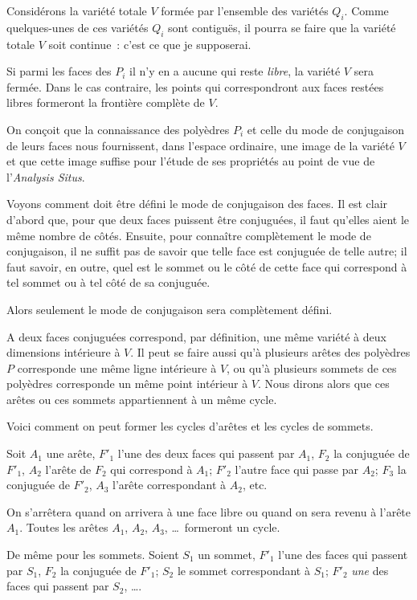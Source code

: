 \documentclass{article}
\begin{document}
Considérons la variété totale $V$ formée par l'ensemble des variétés $Q_{i}$. Comme quelques-unes de ces variétés $Q_{i}$ sont contiguës, il pourra se faire que la variété totale $V$ soit continue~: c'est ce que je supposerai.

Si parmi les faces des $P_{i}$ il n'y en a aucune qui reste \emph{libre}, la variété $V$ sera fermée. Dans le cas contraire, les points qui correspondront aux faces restées libres formeront la frontière complète de $V$.

On conçoit que la connaissance des polyèdres $P_{i}$ et celle du mode de conjugaison de leurs faces nous fournissent, dans l'espace ordinaire, une image de la variété $V$ et que cette image suffise pour l'étude de ses propriétés au point de vue de l'\emph{Analysis Situs}.

Voyons comment doit être défini le mode de conjugaison des faces. Il est clair d'abord que, pour que deux faces puissent être conjuguées, il faut qu'elles aient le même nombre de côtés. Ensuite, pour connaître complètement le mode de conjugaison, il ne suffit pas de savoir que telle face est conjuguée de telle autre; il faut savoir, en outre, quel est le sommet ou le côté de cette face qui correspond à tel sommet ou à tel côté de sa conjuguée.

Alors seulement le mode de conjugaison sera complètement défini.

A deux faces conjuguées correspond, par définition, une même variété à deux dimensions intérieure à $V$. Il peut se faire aussi qu'à plusieurs arêtes des polyèdres $P$ corresponde une même ligne intérieure à $V$, ou qu'à plusieurs sommets de ces polyèdres corresponde un même point intérieur à $V$. Nous dirons alors que ces arêtes ou ces sommets appartiennent à un même cycle.

Voici comment on peut former les cycles d'arêtes et les cycles de sommets.

Soit $A_{1}$ une arête, $F'_{1}$ l'une des deux faces qui passent par $A_{1}$, $F_{2}$ la conjuguée de $F'_{1}$, $A_{2}$ l'arête de $F_{2}$ qui correspond à $A_{1}$; $F'_{2}$ l'autre face qui passe par $A_{2}$; $F_{3}$ la conjuguée de $F'_{2}$, $A_{3}$ l'arête correspondant à $A_{2}$, etc.

On s'arrêtera quand on arrivera à une face libre ou quand on sera
revenu à l'arête $A_{1}$. Toutes les arêtes $A_{1}$, $A_{2}$, $A_{3}$, \ldots\ formeront un cycle.

De même pour les sommets. Soient $S_{1}$ un sommet, $F'_{1}$ l'une des faces qui passent par $S_{1}$, $F_{2}$ la conjuguée de $F'_{1}$; $S_{2}$ le sommet correspondant à $S_{1}$; $F'_{2}$ \emph{une} des faces qui passent par $S_{2}$, \ldots.
\end{document}
